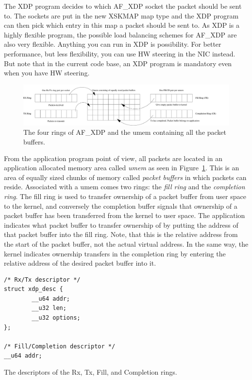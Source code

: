 \documentclass[9pt,numbers,reprint]{sigplanconf}
\begin{document}
The XDP program decides to which AF\_XDP socket the packet should be
sent to. The sockets are put in the new XSKMAP map type and the XDP
program can then pick which entry in this map a packet should be sent
to. As XDP is a highly flexible program, the possible load balancing
schemes for AF\_XDP are also very flexible. Anything you can run in
XDP is possibility. For better performance, but less flexibility, you
can use HW steering in the NIC instead. But note that in the current
code base, an XDP program is mandatory even when you have HW steering.

\begin{figure}[ht]
\includegraphics[width=\textwidth]{queues_and_umem.pdf}
  \caption{The four rings of AF\_XDP and the umem containing all the
    packet buffers.}
  \label{fig:queues_and_umem}
\end{figure}

From the application program point of view, all packets are located in
an application allocated memory area called \emph{umem} as seen in
Figure~\ref{fig:queues_and_umem}. This is an area of equally sized
chunks of memory called \emph{packet buffers} in which packets can
reside. Associated with a umem comes two rings: the \emph{fill ring}
and the \emph{completion ring}. The fill ring is used to transfer
ownership of a packet buffer from user space to the kernel, and
conversely the completion buffer signals that ownership of a packet
buffer has been transferred from the kernel to user space. The
application indicates what packet buffer to transfer ownership of by
putting the address of that packet buffer into the fill ring. Note,
that this is the relative address from the start of the packet buffer,
not the actual virtual address. In the same way, the kernel indicates
ownership transfers in the completion ring by entering the relative
address of the desired packet buffer into it.

\begin{listing}[ht]
\begin{verbatim}
/* Rx/Tx descriptor */
struct xdp_desc {
        __u64 addr;
        __u32 len;
        __u32 options;
};

/* Fill/Completion descriptor */
__u64 addr;
\end{verbatim}
\caption{The descriptors of the Rx, Tx, Fill, and Completion rings.}
\label{lst:desc_structs}
\end{listing}
\end{document}
